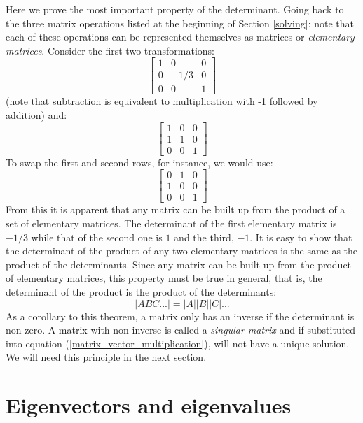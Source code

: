 \documentclass{article}
\begin{document}
Here we prove the most important property of the determinant.
Going back to the three matrix operations listed at the beginning of Section
\ref{solving}: note that each of these operations can be represented 
themselves as matrices or {\it elementary matrices}.
Consider the first two transformations:
\begin{equation}
	\left [ \begin{array}{ccc}
			1 & 0 & 0 \\
			0 & -1/3 & 0 \\
			0 & 0 & 1 
	\end{array} \right ]
\end{equation}
(note that subtraction is equivalent to multiplication with -1 followed by
addition) and:
\begin{equation}
	\left [ \begin{array}{ccc}
			1 & 0 & 0 \\
			1 & 1 & 0 \\
			0 & 0 & 1 
	\end{array} \right ]
\end{equation}
To swap the first and second rows, for instance, we would use:
\begin{equation}
	\left [ \begin{array}{ccc}
			0 & 1 & 0 \\
			1 & 0 & 0 \\
			0 & 0 & 1 
	\end{array} \right ]
\end{equation}
From this it is apparent that any matrix can be built up from the product
of a set of elementary matrices.
The determinant of the first elementary matrix is $-1/3$ while that of the 
second one is $1$ and the third, $-1$.
It is easy to show that the determinant of the product of any two elementary
matrices is the same as the product of the determinants.
Since any matrix can be built up from the product of elementary matrices,
this property must be true in general, that is, the determinant of the
product is the product of the determinants:
\begin{equation}
	|A B C ... | = |A||B||C|...
\end{equation}
As a corollary to this theorem, a matrix only has an inverse if the 
determinant is non-zero. 
A matrix with non inverse is called a {\it singular matrix} and if substituted
into equation (\ref{matrix_vector_multiplication}), 
will not have a unique solution.
We will need this principle in the next section.

\section{Eigenvectors and eigenvalues}
\end{document}
